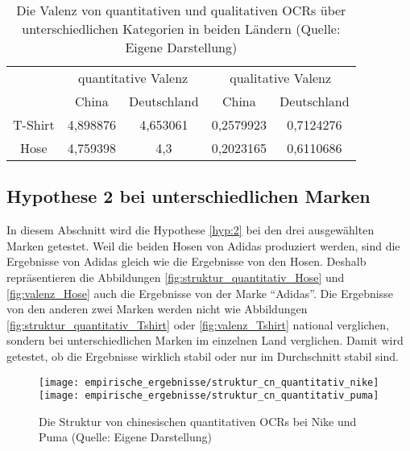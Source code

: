 \begin{table}[htb]
\centering
\begin{tabular}{|c|c|c|c|c|}
\hline
\multirow{2}{*}{} & \multicolumn{2}{c|}{quantitative Valenz} & \multicolumn{2}{c|}{qualitative Valenz} \\ \cline{2-5} 
                  & China             & Deutschland          & China             & Deutschland         \\ \hline
T-Shirt           & 4,898876          & 4,653061             & 0,2579923         & 0,7124276           \\ \hline
Hose              & 4,759398          & 4,3                  & 0,2023165         & 0,6110686           \\ \hline
\end{tabular}
\caption[Die Valenz von quantitativen und qualitativen OCRs über unterschiedlichen Kategorien in beiden Ländern]{Die Valenz von quantitativen und qualitativen \ac{OCRs} über unterschiedlichen Kategorien in beiden Ländern (Quelle: Eigene Darstellung)}
\label{tab:valenzKategorien}
\end{table}


\subsection{Hypothese 2 bei unterschiedlichen Marken}
In diesem Abschnitt wird die Hypothese \ref{hyp:2} bei den drei ausgewählten Marken getestet. Weil die beiden Hosen von Adidas produziert werden, sind die Ergebnisse von Adidas gleich wie die Ergebnisse von den Hosen. Deshalb repräsentieren die Abbildungen \ref{fig:struktur_quantitativ_Hose} und \ref{fig:valenz_Hose} auch die Ergebnisse von der Marke ``Adidas''. Die Ergebnisse von den anderen zwei Marken werden nicht wie Abbildungen \ref{fig:struktur_quantitativ_Tshirt} oder \ref{fig:valenz_Tshirt} national verglichen, sondern bei unterschiedlichen Marken im einzelnen Land verglichen. Damit wird getestet, ob die Ergebnisse wirklich stabil oder nur im Durchschnitt stabil sind.

\begin{figure}[htb]
    {\texttt{[image: empirische\_ergebnisse/struktur\_cn\_quantitativ\_nike]}}    
    {\texttt{[image: empirische\_ergebnisse/struktur\_cn\_quantitativ\_puma]}}   
    \caption[Die Struktur von chinesischen quantitativen OCRs bei Nike und Puma]{Die Struktur von chinesischen quantitativen \ac{OCRs} bei Nike und Puma (Quelle: Eigene Darstellung)}
    \label{fig:struktur_cn_nike_puma}
\end{figure}

